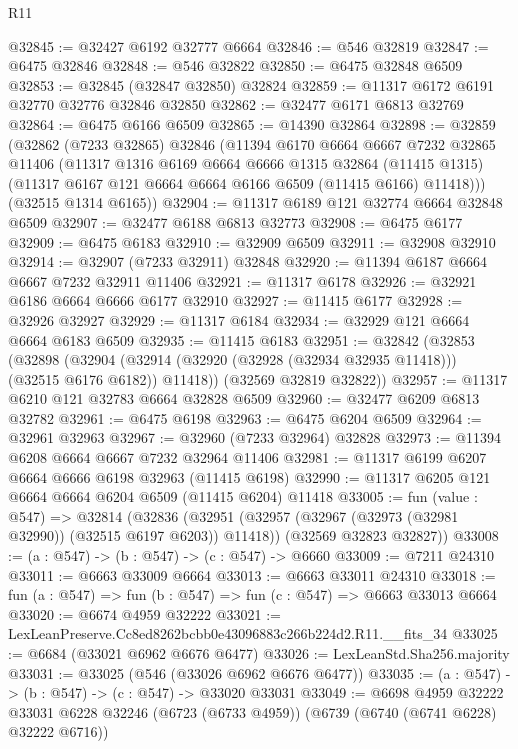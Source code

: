 \begin{lexlean}{R11}
\begin{coremodule}
@32845 := @32427 @6192 @32777 @6664
@32846 := @546 @32819
@32847 := @6475 @32846
@32848 := @546 @32822
@32850 := @6475 @32848 @6509
@32853 := @32845 (@32847 @32850) @32824
@32859 := @11317 @6172 @6191 @32770 @32776 @32846 @32850
@32862 := @32477 @6171 @6813 @32769
@32864 := @6475 @6166 @6509
@32865 := @14390 @32864
@32898 := @32859
    (@32862
      (@7233 @32865)
      @32846
      (@11394
        @6170
        @6664
        @6667
        @7232
        @32865
        @11406
        (@11317
          @1316
          @6169
          @6664
          @6666
          @1315
          @32864
          (@11415 @1315)
          (@11317 @6167 @121 @6664 @6664 @6166 @6509 (@11415 @6166) @11418)))
      (@32515 @1314 @6165))
@32904 := @11317 @6189 @121 @32774 @6664 @32848 @6509
@32907 := @32477 @6188 @6813 @32773
@32908 := @6475 @6177
@32909 := @6475 @6183
@32910 := @32909 @6509
@32911 := @32908 @32910
@32914 := @32907 (@7233 @32911) @32848
@32920 := @11394 @6187 @6664 @6667 @7232 @32911 @11406
@32921 := @11317 @6178
@32926 := @32921 @6186 @6664 @6666 @6177 @32910
@32927 := @11415 @6177
@32928 := @32926 @32927
@32929 := @11317 @6184
@32934 := @32929 @121 @6664 @6664 @6183 @6509
@32935 := @11415 @6183
@32951 := @32842
    (@32853
      (@32898
        (@32904 (@32914 (@32920 (@32928 (@32934 @32935 @11418))) (@32515 @6176 @6182)) @11418))
      (@32569 @32819 @32822))
@32957 := @11317 @6210 @121 @32783 @6664 @32828 @6509
@32960 := @32477 @6209 @6813 @32782
@32961 := @6475 @6198
@32963 := @6475 @6204 @6509
@32964 := @32961 @32963
@32967 := @32960 (@7233 @32964) @32828
@32973 := @11394 @6208 @6664 @6667 @7232 @32964 @11406
@32981 := @11317 @6199 @6207 @6664 @6666 @6198 @32963 (@11415 @6198)
@32990 := @11317 @6205 @121 @6664 @6664 @6204 @6509 (@11415 @6204) @11418
@33005 := fun (value : @547) =>
  @32814
    (@32836
      (@32951 (@32957 (@32967 (@32973 (@32981 @32990)) (@32515 @6197 @6203)) @11418))
      (@32569 @32823 @32827))
@33008 := (a : @547) -> (b : @547) -> (c : @547) -> @6660
@33009 := @7211 @24310
@33011 := @6663 @33009 @6664
@33013 := @6663 @33011 @24310
@33018 := fun (a : @547) => fun (b : @547) => fun (c : @547) => @6663 @33013 @6664
@33020 := @6674 @4959 @32222
@33021 := LexLeanPreserve.Cc8ed8262bcbb0e43096883c266b224d2.R11.__fits_34
@33025 := @6684 (@33021 @6962 @6676 @6477)
@33026 := LexLeanStd.Sha256.majority
@33031 := @33025 (@546 (@33026 @6962 @6676 @6477))
@33035 := (a : @547) -> (b : @547) -> (c : @547) -> @33020 @33031
@33049 := @6698
    @4959
    @32222
    @33031
    @6228
    @32246
    (@6723 (@6733 @4959))
    (@6739 (@6740 (@6741 @6228) @32222 @6716))

\end{coremodule}
\end{lexlean}
